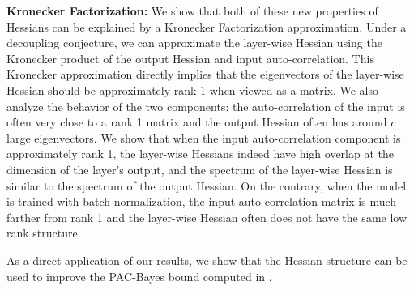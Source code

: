 \textbf{Kronecker Factorization:} We show that both of these new properties of Hessians can be explained by a Kronecker Factorization approximation. Under a decoupling conjecture, we can approximate the layer-wise Hessian using the Kronecker product of the output Hessian and input auto-correlation. This Kronecker approximation directly implies that the eigenvectors of the layer-wise Hessian should be approximately rank 1 when viewed as a matrix. We also analyze the behavior of the two components: the auto-correlation of the input is often very close to a rank 1 matrix and the output Hessian often has around $c$ large eigenvectors. We show that when the input auto-correlation component is approximately rank 1, the layer-wise Hessians indeed have high overlap at the dimension of the layer's output, and the spectrum of the layer-wise Hessian is similar to the spectrum of the output Hessian. On the contrary, when the model is trained with batch normalization, the input auto-correlation matrix is much farther from rank 1 and the layer-wise Hessian often does not have the same low rank structure.

As a direct application of our results, we show that the Hessian structure can be used to improve the PAC-Bayes bound computed in \citet{dziugaite2017computing}. %

